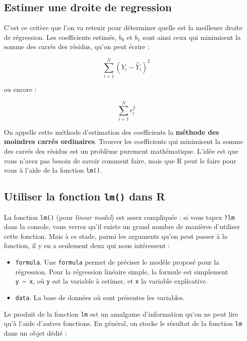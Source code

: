 \documentclass[
]{book}
\providecommand{\tightlist}{%
  \setlength{\itemsep}{0pt}\setlength{\parskip}{0pt}}
\begin{document}
\hypertarget{estimer-une-droite-de-regression}{%
\subsection{Estimer une droite de regression}\label{estimer-une-droite-de-regression}}

C'est ce critère que l'on va retenir pour déterminer quelle est la meilleure droite de régression. Les coefficients estimés, \(b_0\) et \(b_1\) sont ainsi ceux qui minimisent la somme des carrés des résidus, qu'on peut écrire :

\[ \sum^{N}_{i = 1} (Y_i- \hat{Y}_i)^2 \]

ou encore :

\[ \sum^{N}_{i = 1} \epsilon_i^2 \]

On appelle cette méthode d'estimation des coefficients la \textbf{méthode des moindres carrés ordinaires}. Trouver les coefficients qui minimisent la somme des carrés des résidus est un problème purement mathématique. L'idée est que vous n'avez pas besoin de savoir comment faire, mais que R peut le faire pour vous à l'aide de la fonction \texttt{lm()}.

\hypertarget{utiliser-la-fonction-lm-dans-r}{%
\subsection{\texorpdfstring{Utiliser la fonction \texttt{lm()} dans R}{Utiliser la fonction lm() dans R}}\label{utiliser-la-fonction-lm-dans-r}}

La fonction \texttt{lm()} (pour \emph{linear model}) est assez compliquée : si vous tapez \texttt{?lm} dans la console, vous verrez qu'il existe un grand nombre de manières d'utiliser cette fonction. Mais à ce stade, parmi les arguments qu'on peut passer à la fonction, il y en a seulement deux qui nous intéressent :

\begin{itemize}
\tightlist
\item
  \texttt{formula}. Une \texttt{formula} permet de préciser le modèle proposé pour
  la régression. Pour la régression linéaire simple, la formule est
  simplement \texttt{y\ \textasciitilde{}\ x}, où \texttt{y} est la variable à estimer, et \texttt{x} la
  variable explicative.
\item
  \texttt{data}. La base de données où sont présentes les variables.
\end{itemize}

Le produit de la fonction \texttt{lm} est un amalgame d'information qu'on ne peut lire qu'à l'aide d'autres fonctions. En général, on stocke le résultat de la fonction \texttt{lm} dans un objet dédié :
\end{document}
